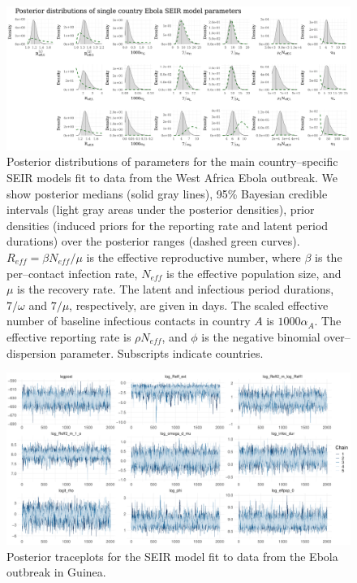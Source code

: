 \begin{figure}
	\begin{fullpage}
		\centering
		\includegraphics[width=\linewidth]{figures/ebola_single_posts}
		\caption[Posterior distributions of parameters of the main country--specific SEIR models fit to data from the West Africa Ebola outbreak.]{Posterior distributions of parameters for the main country--specific SEIR models fit to data from the West Africa Ebola outbreak. We show posterior medians (solid gray lines), 95\% Bayesian credible intervals (light gray areas under the posterior densities), prior densities (induced priors for the reporting rate and latent period durations) over the posterior ranges (dashed green curves). $ R_{eff} = \beta N_{eff}/\mu $ is the effective reproductive number, where $ \beta $ is the per--contact infection rate, $ N_{eff} $ is the effective population size, and $ \mu $ is the recovery rate. The latent and infectious period durations, $ 7/\omega $ and $ 7/\mu $, respectively, are given in days. The scaled effective number of baseline infectious contacts in country $ A $ is $ 1000\alpha_{A} $. The effective reporting rate is $ \rho N_{eff} $, and $ \phi $ is the negative binomial over--dispersion parameter. Subscripts indicate countries.}
		\label{fig:ebola_single_posts}
	\end{fullpage}
\end{figure}

\begin{figure}
	\centering
	\includegraphics[width=\linewidth]{figures/guin_tight_traces}
	\caption{Posterior traceplots for the SEIR model fit to data from the Ebola outbreak in Guinea.}
	\label{fig:guineatraces}
\end{figure}

